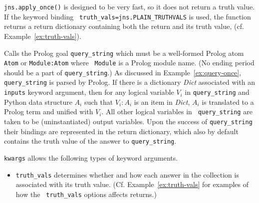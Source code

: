 \begin{description}
  {\tt jns.apply\_once()} is designed to be very fast, so it does not
  return a truth value.  If the keyword binding {\tt
    truth\_vals=jns.PLAIN\_TRUTHVALS} is used, the function returns a
  return dictionary containing both the return and its truth value,
  (cf. Example~\ref{ex:truth-vals}).



  Calls the Prolog goal {\tt query\_string} which must be a
  well-formed Prolog atom {\tt Atom} or {\tt Module:Atom} where {\tt
    Module} is a Prolog module name.  (No ending period should be a
  part of {\tt query\_string}.)  As discussed in
  Example~\ref{ex:query-once}, {\tt query\_string} is parsed by
  Prolog.  If there is a dictionary {\em Dict} associated with an {\tt
    inputs} keyword argument, then for any logical variable $V_i$ in
  {\tt query\_string} and Python data structure $A_i$ such that
  $V_i:A_i$ is an item in {\em Dict}, $A_i$ is translated to a Prolog
  term and unified with $V_i$.  All other logical variables in {\tt
    query\_string} are taken to be (uninstantiated) output variables.
  Upon the success of {\tt query\_string} their bindings are
  represented in the return dictionary, which also by default contains
  the truth value of the answer to {\tt query\_string}.

      {\tt kwargs} allows the following types of keyword arguments.
      \begin{itemize}
      \item {\tt truth\_vals} determines whether and how each answer
        in the collection is associated with its truth value.
        (Cf. Example~\ref{ex:truth-vals} for examples of how the {\tt
            truth\_vals} options affects returns.)


\end{itemize}
\end{description}
